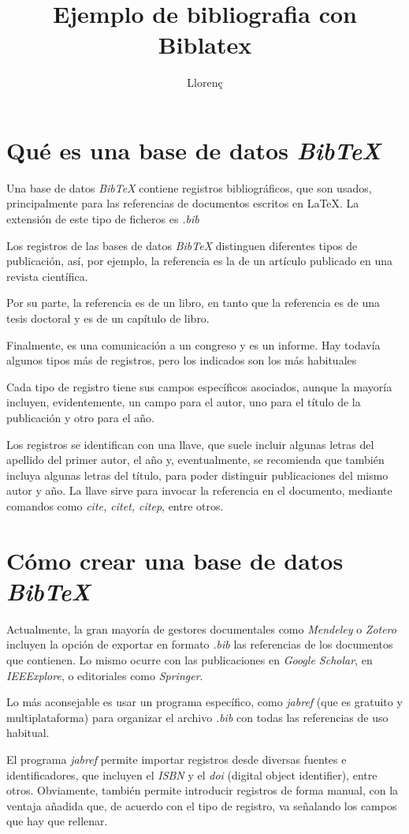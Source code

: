 \documentclass[a4paper, 12pt]{article}
\title{Ejemplo de bibliografia con Biblatex}
\author{Llorenç}
\date {}
\begin{document}
\maketitle
\tableofcontents

\section{Qué es una base de datos {\em Bib\TeX}}

Una base de datos {\em Bib\TeX} contiene registros bibliográficos, que son usados, principalmente para las referencias de documentos escritos en \LaTeX{}. La extensión de este tipo de ficheros es {\em .bib}

Los registros de las bases de datos {\em Bib\TeX} distinguen diferentes tipos de publicación, así, por ejemplo, la referencia \cite{Valverde2008} es la de un artículo publicado en una revista científica.

Por su parte, la referencia \cite{Valverde2015} es de un libro, en tanto que la referencia \cite{MorenoNavarro2016} es de una tesis doctoral y \cite{BouchonMeunier1997} es de un capítulo de libro.

Finalmente, \cite{Almirall2010} es una comunicación a un congreso y \cite{Valverde1984} es un informe. Hay todavía algunos tipos más de registros, pero los indicados son los más habituales

Cada tipo de registro tiene sus campos específicos asociados, aunque la mayoría incluyen, evidentemente, un campo para el autor, uno para el título de la publicación y otro para el año.

Los registros se identifican con una llave, que suele incluir algunas letras del apellido del primer autor, el año y, eventualmente, se recomienda que también incluya algunas letras del título, para poder distinguir publicaciones del mismo autor y año. La llave sirve para invocar la referencia en el documento, mediante comandos como {\em cite, citet, citep}, entre otros.

\section{Cómo crear una base de datos {\em Bib\TeX}}

Actualmente, la gran mayoría de gestores documentales como {\em Mendeley} o {\em Zotero} incluyen la opción de exportar en formato {\em .bib} las referencias de los documentos que contienen. Lo mismo ocurre con las publicaciones en {\em Google Scholar}, en {\em IEEExplore}, o editoriales como {\em Springer}. 

Lo más aconsejable es usar un programa específico, como {\em jabref} (que es gratuito y multiplataforma) para organizar el archivo {\em .bib} con todas las referencias de uso habitual.

El programa {\em jabref} permite importar registros desde diversas fuentes e identificadores, que incluyen el {\em ISBN} y el {\em doi} (digital object identifier), entre otros. Obviamente, también permite introducir registros de forma manual, con la ventaja añadida que, de acuerdo con el tipo de registro, va señalando los campos que hay que rellenar.

\printbibliography[
heading=bibintoc,
title={Referencias}
]
\end{document}
